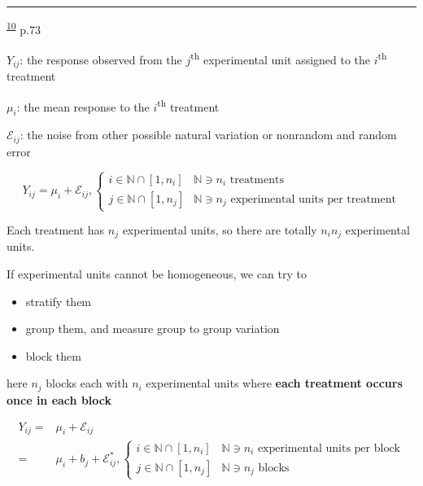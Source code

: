 \documentclass[
]{book}
\providecommand{\tightlist}{%
  \setlength{\itemsep}{0pt}\setlength{\parskip}{0pt}}
\theoremstyle{definition}
\theoremstyle{definition}
\theoremstyle{definition}
\theoremstyle{definition}
\theoremstyle{remark}
\begin{document}
\begin{center}\rule{0.5\linewidth}{0.5pt}\end{center}

\textsuperscript{\protect\hyperlink{ref-milliken2004}{10}} p.73

\(Y_{\scriptscriptstyle{ij}}\): the response observed from the \(j\)\textsuperscript{th} experimental unit assigned to the \(i\)\textsuperscript{th} treatment

\(\mu_{\scriptscriptstyle{i}}\): the mean response to the \(i\)\textsuperscript{th} treatment

\(\mathcal{E}_{\scriptscriptstyle{ij}}\): the noise from other possible natural variation or nonrandom and random error

\[
Y_{{\scriptscriptstyle i}{\scriptscriptstyle j}}=\mu_{{\scriptscriptstyle i}}+\mathcal{E}_{{\scriptscriptstyle i}{\scriptscriptstyle j}},\begin{cases}
i\in\mathbb{N}\cap\left[1,n_{{\scriptscriptstyle i}}\right] & \mathbb{N}\ni n_{{\scriptscriptstyle i}}\text{ treatments}\\
j\in\mathbb{N}\cap\left[1,n_{{\scriptscriptstyle j}}\right] & \mathbb{N}\ni n_{{\scriptscriptstyle j}}\text{ experimental units per treatment}
\end{cases}
\]

Each treatment has \(n_{j}\) experimental units, so there are totally \(n_{i}n_{j}\) experimental units.

If experimental units cannot be homogeneous, we can try to

\begin{itemize}
\tightlist
\item
  stratify them
\item
  group them, and measure group to group variation
\item
  block them
\end{itemize}

here \(n_{j}\) blocks each with \(n_{i}\) experimental units where \textbf{each treatment occurs once in each block}

\[
\begin{aligned}
Y_{{\scriptscriptstyle i}{\scriptscriptstyle j}}= & \mu_{{\scriptscriptstyle i}}+\mathcal{E}_{{\scriptscriptstyle i}{\scriptscriptstyle j}}\\
= & \mu_{{\scriptscriptstyle i}}+b_{{\scriptscriptstyle j}}+\mathcal{E}_{{\scriptscriptstyle i}{\scriptscriptstyle j}}^{*},\begin{cases}
i\in\mathbb{N}\cap\left[1,n_{{\scriptscriptstyle i}}\right] & \mathbb{N}\ni n_{{\scriptscriptstyle i}}\text{ experimental units per block}\\
j\in\mathbb{N}\cap\left[1,n_{{\scriptscriptstyle j}}\right] & \mathbb{N}\ni n_{{\scriptscriptstyle j}}\text{ blocks}
\end{cases}
\end{aligned}
\]
\end{document}
